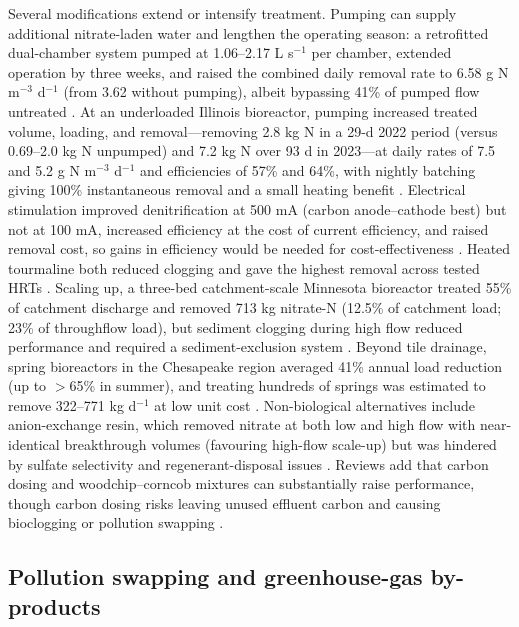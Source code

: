 Several modifications extend or intensify treatment. Pumping can supply additional nitrate-laden water and lengthen the operating season: a retrofitted dual-chamber system pumped at 1.06--2.17 L s$^{-1}$ per chamber, extended operation by three weeks, and raised the combined daily removal rate to 6.58 g N m$^{-3}$ d$^{-1}$ (from 3.62 without pumping), albeit bypassing 41\% of pumped flow untreated \parencite{Hartfiel2023}. At an underloaded Illinois bioreactor, pumping increased treated volume, loading, and removal---removing 2.8 kg N in a 29-d 2022 period (versus 0.69--2.0 kg N unpumped) and 7.2 kg N over 93 d in 2023---at daily rates of 7.5 and 5.2 g N m$^{-3}$ d$^{-1}$ and efficiencies of 57\% and 64\%, with nightly batching giving 100\% instantaneous removal and a small heating benefit \parencite{DíazGarcía2025}. Electrical stimulation improved denitrification at 500 mA (carbon anode--cathode best) but not at 100 mA, increased efficiency at the cost of current efficiency, and raised removal cost, so gains in efficiency would be needed for cost-effectiveness \parencite{Law2018}. Heated tourmaline both reduced clogging and gave the highest removal across tested HRTs \parencite{Ma2021}. Scaling up, a three-bed catchment-scale Minnesota bioreactor treated 55\% of catchment discharge and removed 713 kg nitrate-N (12.5\% of catchment load; 23\% of throughflow load), but sediment clogging during high flow reduced performance and required a sediment-exclusion system \parencite{Feyereisen2023}. Beyond tile drainage, spring bioreactors in the Chesapeake region averaged 41\% annual load reduction (up to $>$65\% in summer), and treating hundreds of springs was estimated to remove 322--771 kg d$^{-1}$ at low unit cost \parencite{Easton2019}. Non-biological alternatives include anion-exchange resin, which removed nitrate at both low and high flow with near-identical breakthrough volumes (favouring high-flow scale-up) but was hindered by sulfate selectivity and regenerant-disposal issues \parencite{MAGETTE1990}. Reviews add that carbon dosing and woodchip--corncob mixtures can substantially raise performance, though carbon dosing risks leaving unused effluent carbon and causing bioclogging or pollution swapping \parencite{Wang2025b}.

\subsection{Pollution swapping and greenhouse-gas by-products}

